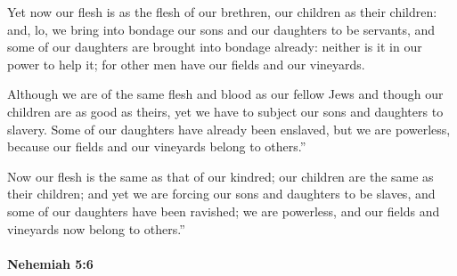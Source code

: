 			\begin{versebox}
					\item[BHS] 
					\item[LXX] 
					\item[ASV] Yet now our flesh is as the flesh of our brethren, our children as their children: and, lo, we bring into bondage our sons and our daughters to be servants, and some of our daughters are brought into bondage already: neither is it in our power to help it; for other men have our fields and our vineyards.
					\item[NIV] Although we are of the same flesh and blood as our fellow Jews and though our children are as good as theirs, yet we have to subject our sons and daughters to slavery. Some of our daughters have already been enslaved, but we are powerless, because our fields and our vineyards belong to others.”
					\item[NRSV] Now our flesh is the same as that of our kindred; our children are the same as their children; and yet we are forcing our sons and daughters to be slaves, and some of our daughters have been ravished; we are powerless, and our fields and vineyards now belong to others.”
			\end{versebox}

		\paragraph{Nehemiah 5:6} %
			\label{NEHEMIAH-5-6}

